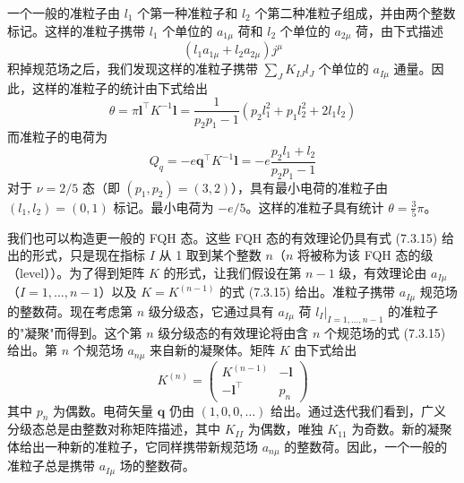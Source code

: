 一个一般的准粒子由 $l_{1}$ 个第一种准粒子和 $l_{2}$ 个第二种准粒子组成，并由两个整数标记。这样的准粒子携带 $l_{1}$ 个单位的 $a_{1\mu}$ 荷和 $l_{2}$ 个单位的 $a_{2\mu}$ 荷，由下式描述
\begin{equation*}
(l_{1}a_{1\mu}+l_{2}a_{2\mu})j^{\mu} \tag{7.3.16}
\end{equation*}
积掉规范场之后，我们发现这样的准粒子携带 $\sum_{J}K_{IJ}l_{J}$ 个单位的 $a_{I\mu}$ 通量。因此，这样的准粒子的统计由下式给出
\begin{equation*}
\theta=\pi\pmb{l}^{\top}K^{-1}\pmb{l}
=\frac{1}{p_{2}p_{1}-1}\left(p_{2}l_{1}^{2}+p_{1}l_{2}^{2}+2l_{1}l_{2}\right)
\end{equation*}
而准粒子的电荷为
\begin{equation*}
Q_{q}=-e\boldsymbol{q}^{\top}K^{-1}\pmb{l}
=-e\frac{p_{2}l_{1}+l_{2}}{p_{2}p_{1}-1}
\end{equation*}
对于 $\nu=2/5$ 态（即 $(p_{1},p_{2})=(3,2)$），具有最小电荷的准粒子由 $(l_{1},l_{2})=(0,1)$ 标记。最小电荷为 $-e/5$。这样的准粒子具有统计 $\theta=\frac{3}{5}\pi$。

我们也可以构造更一般的 FQH 态。这些 FQH 态的有效理论仍具有式 (7.3.15) 给出的形式，只是现在指标 $I$ 从 1 取到某个整数 $n$（$n$ 将被称为该 FQH 态的级（level））。为了得到矩阵 $K$ 的形式，让我们假设在第 $n-1$ 级，有效理论由 $a_{I\mu}$（$I=1,\ldots,n-1$）以及 $K=K^{(n-1)}$ 的式 (7.3.15) 给出。准粒子携带 $a_{I\mu}$ 规范场的整数荷。现在考虑第 $n$ 级分级态，它通过具有 $a_{I\mu}$ 荷 $l_{I}|_{I=1,\ldots,n-1}$ 的准粒子的"凝聚"而得到。这个第 $n$ 级分级态的有效理论将由含 $n$ 个规范场的式 (7.3.15) 给出。第 $n$ 个规范场 $a_{n\mu}$ 来自新的凝聚体。矩阵 $K$ 由下式给出
\begin{equation*}
K^{(n)}=\begin{pmatrix} K^{(n-1)} & -\pmb{l}\\ -\pmb{l}^{\top} & p_{n} \end{pmatrix}
\end{equation*}
其中 $p_{n}$ 为偶数。电荷矢量 $\boldsymbol{q}$ 仍由 $(1,0,0,\ldots)$ 给出。通过迭代我们看到，广义分级态总是由整数对称矩阵描述，其中 $K_{II}$ 为偶数，唯独 $K_{11}$ 为奇数。新的凝聚体给出一种新的准粒子，它同样携带新规范场 $a_{n\mu}$ 的整数荷。因此，一个一般的准粒子总是携带 $a_{I\mu}$ 场的整数荷。

